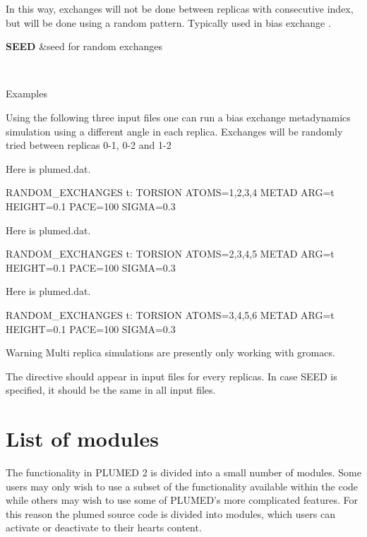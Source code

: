 In this way, exchanges will not be done between replicas with consecutive index, but will be done using a random pattern. Typically used in bias exchange \cite{piana}.

\begin{TabularC}{2}
\hline
{\bfseries  S\+E\+E\+D } &seed for random exchanges  

\\
\end{TabularC}


\begin{DoxyParagraph}{Examples}

\end{DoxyParagraph}
Using the following three input files one can run a bias exchange metadynamics simulation using a different angle in each replica. Exchanges will be randomly tried between replicas 0-\/1, 0-\/2 and 1-\/2

Here is plumed.\+dat. \begin{DoxyVerb}RANDOM_EXCHANGES
t: TORSION ATOMS=1,2,3,4
METAD ARG=t HEIGHT=0.1 PACE=100 SIGMA=0.3
\end{DoxyVerb}


Here is plumed.\+dat. \begin{DoxyVerb}RANDOM_EXCHANGES
t: TORSION ATOMS=2,3,4,5
METAD ARG=t HEIGHT=0.1 PACE=100 SIGMA=0.3
\end{DoxyVerb}


Here is plumed.\+dat. \begin{DoxyVerb}RANDOM_EXCHANGES
t: TORSION ATOMS=3,4,5,6
METAD ARG=t HEIGHT=0.1 PACE=100 SIGMA=0.3
\end{DoxyVerb}


\begin{DoxyWarning}{Warning}
Multi replica simulations are presently only working with gromacs.

The directive should appear in input files for every replicas. In case S\+E\+E\+D is specified, it should be the same in all input files. 
\end{DoxyWarning}
\hypertarget{mymodules}{}\section{List of modules}\label{mymodules}
The functionality in P\+L\+U\+M\+E\+D 2 is divided into a small number of modules. Some users may only wish to use a subset of the functionality available within the code while others may wish to use some of P\+L\+U\+M\+E\+D's more complicated features. For this reason the plumed source code is divided into modules, which users can activate or deactivate to their hearts content.


